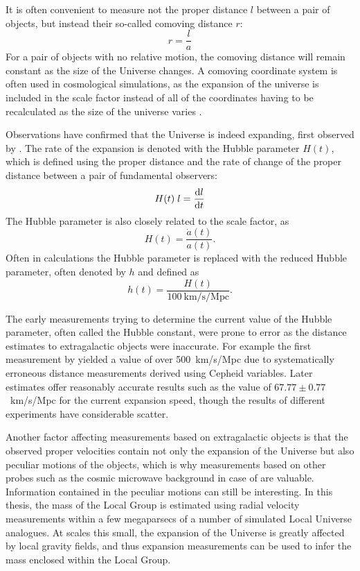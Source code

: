 \documentclass[english, twoside]{HYgradu}
\begin{document}
It is often convenient to measure not the proper distance $l$ between a pair of objects, but instead their so-called comoving distance $r$: \citep{mo2010galaxy}
\begin{equation} \label{comoving}
r = \frac{l}{a}
\end{equation}
For a pair of objects with no relative motion, the comoving distance will remain constant as the size of the Universe changes. A comoving coordinate system is often used in cosmological simulations, as the expansion of the universe is included in the scale factor instead of all of the coordinates having to be recalculated as the size of the universe varies \citep{griebel1002numerical}.

Observations have confirmed that the Universe is indeed expanding, first observed by \citet{hubble1929relation}. The rate of the expansion is denoted with the Hubble parameter $H(t)$, which is defined using the proper distance and the rate of change of the proper distance between a pair of fundamental observers:
\begin{equation}
H(t)\; l = \dv{l}{t}
\end{equation}
The Hubble parameter is also closely related to the scale factor, as \citep{mo2010galaxy}
\begin{equation}\label{reducedhubble}
H(t) = \frac{\dot{a}(t)}{a(t)}.
\end{equation}
Often in calculations the Hubble parameter is replaced with the reduced Hubble parameter, often denoted by $h$ and defined as \citep{montgomery2012introduction}
\begin{equation}
h(t) = \frac{H(t)}{100\ \mathrm{km/s/Mpc}}.
\end{equation}


The early measurements trying to determine the current value of the Hubble parameter, often called the Hubble constant, were prone to error as the distance estimates to extragalactic objects were inaccurate. For example the first measurement by \citet{hubble1929relation} yielded a value of over 500~km/s/Mpc due to systematically erroneous distance measurements derived using Cepheid variables. Later estimates offer reasonably accurate results such as the \citet{planck2014resultsXVI} value of $67.77 \pm 0.77$~km/s/Mpc for the current expansion speed, though the results of different experiments have considerable scatter.

Another factor affecting measurements based on extragalactic objects is that the observed proper velocities contain not only the expansion of the Universe but also peculiar motions of the objects, which is why measurements based on other probes such as the cosmic microwave background in case of \citet{planck2016resultsI} are valuable. Information contained in the peculiar motions can still be interesting. In this thesis, the mass of the Local Group is estimated using radial velocity measurements within a few megaparsecs of a number of simulated Local Universe analogues. At scales this small, the expansion of the Universe is greatly affected by local gravity fields, and thus expansion measurements can be used to infer the mass enclosed within the Local Group.
\end{document}
